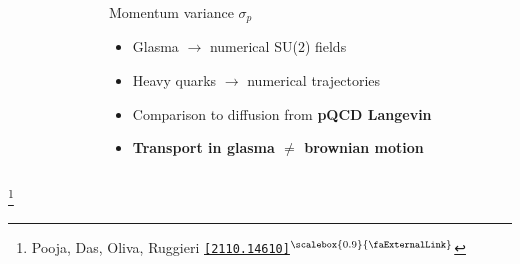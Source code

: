 \documentclass[aspectratio=169,11pt,usenames,dvipsnames]{beamer}
\renewcommand{\thefootnote}{\color{customblue}\faPaperPlaneO}
\newcommand\blfootnote[1]{%
  \begingroup
  \renewcommand\thefootnote{}\footnote{#1}%
  \addtocounter{footnote}{-1}%
  \endgroup
}
\begin{document}
\begin{frame}[t]
\begin{columns}[onlytextwidth,t]
\begin{figure}
        \end{figure}
        \begin{center}
            {\Large\color{isgold} Momentum variance $\sigma_p$ \\[10pt]}
            \footnotesize
                \begin{itemize}
                    \item {\color{lightgray}Glasma $\rightarrow$ numerical SU($2$) fields}
                    \item {\color{lightgray}Heavy quarks $\rightarrow$ numerical trajectories}
                    \item {\color{lightgray}Comparison to diffusion from {\bfseries pQCD Langevin}}\\[15pt]
                    \item {\color{destacado}\bfseries\normalsize{Transport in glasma $\boldsymbol{\neq}$ {\bfseries brownian motion}}}
                \end{itemize}
        \end{center}
    \end{columns}
    \blfootnote{\scriptsize Pooja, Das, Oliva, Ruggieri \href{https://arxiv.org/abs/2110.14610}{\color{palgold}\texttt{[2110.14610]}$^\text{\scalebox{0.9}{\faExternalLink}}$}}
\end{frame}
\end{document}

